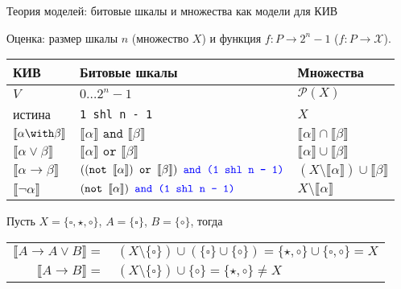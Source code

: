 \documentclass[aspectratio=169]{beamer}
\begin{document}
\begin{frame}{Теория моделей: битовые шкалы и множества как модели для КИВ}

Оценка: размер шкалы $n$ (множество $X$) и функция $f: P \rightarrow 2^n-1$ ($f : P \rightarrow \mathcal{X}$).

\begin{center}\begin{tabular}{lll} 
 КИВ & Битовые шкалы & Множества \\\hline
 $V$ & $0 \dots 2^{n}-1$ & $\mathcal{P}(X)$ \\
 истина & \texttt{1 shl n - 1} & $X$\\
 $\llbracket \alpha \with \beta \rrbracket$ & $\llbracket \alpha \rrbracket\texttt{ and }\llbracket \beta \rrbracket$  & $\llbracket \alpha \rrbracket \cap \llbracket \beta \rrbracket$\\
 $\llbracket \alpha \vee \beta \rrbracket$ & $\llbracket \alpha \rrbracket\texttt{ or }\llbracket \beta \rrbracket$ & $\llbracket \alpha \rrbracket \cup \llbracket \beta \rrbracket$\\
 $\llbracket \alpha \rightarrow \beta \rrbracket$ & $((\texttt{not } \llbracket \alpha \rrbracket)\texttt{ or }\llbracket \beta \rrbracket) {\color{blue}\texttt{ and (1 shl n - 1)}}$ & $(X \setminus \llbracket \alpha \rrbracket) \cup \llbracket \beta \rrbracket$\\
 $\llbracket \neg\alpha \rrbracket$ & $(\texttt{not } \llbracket \alpha \rrbracket){\color{blue}\texttt{ and (1 shl n - 1)}} $ & $X \setminus \llbracket \alpha \rrbracket$\\
\end{tabular}\end{center}

\begin{exmprus}Пусть $X = \{ \square, \star, \circ \}$, $A = \{ \square \}$, $B = \{\circ\}$, тогда 
\begin{center}\begin{tabular}{rl}
$\llbracket A \rightarrow A\vee B \rrbracket = $& $\left(X \setminus \{ \square \}\right) \cup (\{\square\}\cup\{\circ\}) = \{\star,\circ\}\cup\{\square,\circ\} = X$ \\
$\llbracket A \rightarrow B\rrbracket =$ & $(X \setminus \{ \square \}) \cup \{ \circ \} = \{ \star, \circ \} \ne X$
\end{tabular}\end{center}
\end{exmprus}
\end{frame}
\end{document}
